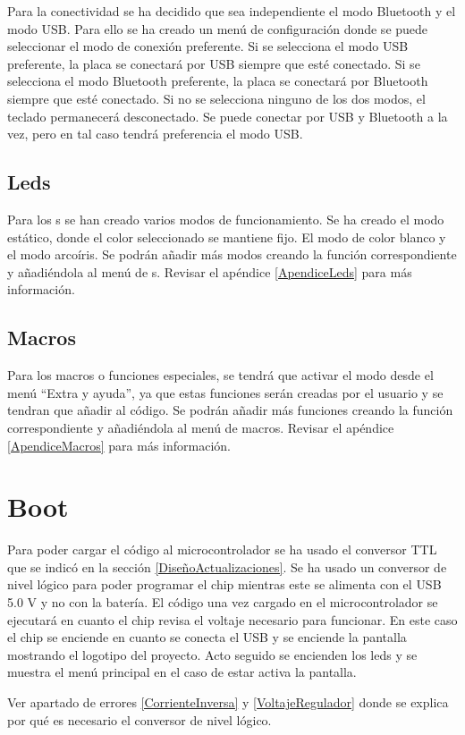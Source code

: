 Para la conectividad se ha decidido que sea independiente el modo \gls{Bluetooth} y el modo \gls{USB}. Para ello se ha creado un menú de configuración donde se puede seleccionar el modo de conexión preferente. Si se selecciona el modo \gls{USB} preferente, la placa se conectará por \gls{USB} siempre que esté conectado. Si se selecciona el modo \gls{Bluetooth} preferente, la placa se conectará por \gls{Bluetooth} siempre que esté conectado. Si no se selecciona ninguno de los dos modos, el teclado permanecerá desconectado. Se puede conectar por \gls{USB} y \gls{Bluetooth} a la vez, pero en tal caso tendrá preferencia el modo \gls{USB}.

\subsection{Leds}

Para los s se han creado varios modos de funcionamiento. Se ha creado el modo estático, donde el color seleccionado se mantiene fijo. El modo de color blanco y el modo arcoíris. Se podrán añadir más modos creando la función correspondiente y añadiéndola al menú de s. Revisar el apéndice \ref{ApendiceLeds} para más información.

\subsection{Macros}

Para los macros o funciones especiales, se tendrá que activar el modo desde el menú ``Extra y ayuda'', ya que estas funciones serán creadas por el usuario y se tendran que añadir al código. Se podrán añadir más funciones creando la función correspondiente y añadiéndola al menú de macros. Revisar el apéndice \ref{ApendiceMacros} para más información.

\section{Boot}

Para poder cargar el código al microcontrolador se ha usado el conversor \gls{TTL} que se indicó en la sección \ref{DiseñoActualizaciones}. Se ha usado un conversor de nivel lógico para poder programar el chip mientras este se alimenta con el \gls{USB} 5.0 V y no con la batería.
El código una vez cargado en el microcontrolador se ejecutará en cuanto el chip revisa el voltaje necesario para funcionar. En este caso el chip se enciende en cuanto se conecta el \gls{USB} y se enciende la pantalla mostrando el logotipo del proyecto. Acto seguido se encienden los leds y se muestra el menú principal en el caso de estar activa la pantalla.

\begin{tcolorbox}[colback=red!11!white, colframe=red!50!white, title=Errores]
    Ver apartado de errores \ref{CorrienteInversa} y \ref{VoltajeRegulador} donde se explica por qué es necesario el conversor de nivel lógico.
\end{tcolorbox}